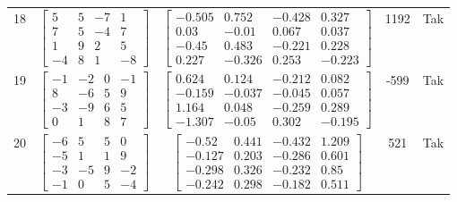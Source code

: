 \documentclass[a4paper,12pt]{article}
\begin{document}
\begin{tabular}{c c c c c}
18
&
$\begin{bmatrix} 5 & 5 & -7 & 1 \\ 7 & 5 & -4 & 7 \\ 1 & 9 & 2 & 5 \\ -4 & 8 & 1 & -8 \end{bmatrix}$
&
$\begin{bmatrix} -0.505 & 0.752 & -0.428 & 0.327 \\ 0.03 & -0.01 & 0.067 & 0.037 \\ -0.45 & 0.483 & -0.221 & 0.228 \\ 0.227 & -0.326 & 0.253 & -0.223 \end{bmatrix}$
&
1192
&
Tak
\\
19
&
$\begin{bmatrix} -1 & -2 & 0 & -1 \\ 8 & -6 & 5 & 9 \\ -3 & -9 & 6 & 5 \\ 0 & 1 & 8 & 7 \end{bmatrix}$
&
$\begin{bmatrix} 0.624 & 0.124 & -0.212 & 0.082 \\ -0.159 & -0.037 & -0.045 & 0.057 \\ 1.164 & 0.048 & -0.259 & 0.289 \\ -1.307 & -0.05 & 0.302 & -0.195 \end{bmatrix}$
&
-599
&
Tak
\\
20
&
$\begin{bmatrix} -6 & 5 & 5 & 0 \\ -5 & 1 & 1 & 9 \\ -3 & -5 & 9 & -2 \\ -1 & 0 & 5 & -4 \end{bmatrix}$
&
$\begin{bmatrix} -0.52 & 0.441 & -0.432 & 1.209 \\ -0.127 & 0.203 & -0.286 & 0.601 \\ -0.298 & 0.326 & -0.232 & 0.85 \\ -0.242 & 0.298 & -0.182 & 0.511 \end{bmatrix}$
&
521
&
Tak
\\
\end{tabular} \egroup \newpage
\end{document}
